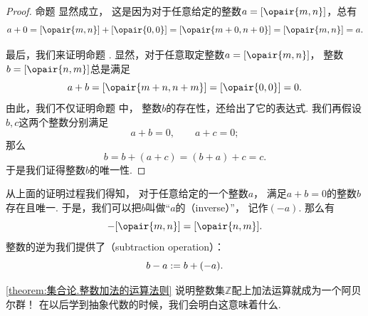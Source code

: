 \begin{theorem}
\begin{proof}
命题  显然成立，
这是因为对于任意给定的整数\(a = \EquivalenceClassB{\opair{m,n}}[\sim]\)，总有\begin{equation*}
	a+0
	= \EquivalenceClassB{\opair{m,n}}[\sim]+\EquivalenceClassB{\opair{0,0}}[\sim]
	= \EquivalenceClassB{\opair{m+0,n+0}}[\sim]
	= \EquivalenceClassB{\opair{m,n}}[\sim]
	= a.
\end{equation*}

最后，我们来证明命题 .
显然，对于任意取定整数\(a = \EquivalenceClassB{\opair{m,n}}[\sim]\)，
整数\(b = \EquivalenceClassB{\opair{n,m}}[\sim]\)总是满足\begin{equation*}
	a+b
	= \EquivalenceClassB{\opair{m+n,n+m}}[\sim]
	= \EquivalenceClassB{\opair{0,0}}[\sim]
	= 0.
\end{equation*}
由此，我们不仅证明命题  中，
整数\(b\)的存在性，还给出了它的表达式.
我们再假设\(b,c\)这两个整数分别满足\begin{equation*}
	a+b=0, \qquad
	a+c=0;
\end{equation*}
那么\begin{equation*}
	b=b+(a+c)=(b+a)+c=c.
\end{equation*}
于是我们证得整数\(b\)的唯一性.
\end{proof}
\end{theorem}

从上面的证明过程我们得知，
对于任意给定的一个整数\(a\)，
满足\(a+b=0\)的整数\(b\)存在且唯一.
于是，我们可以把\(b\)叫做“\(a\)的（inverse）”，
记作\((-a)\).
那么有\begin{equation}
	-\EquivalenceClassB{\opair{m,n}}[\sim]=\EquivalenceClassB{\opair{n,m}}[\sim].
\end{equation}
整数的逆为我们提供了（subtraction operation）：
\begin{equation}
	b-a := b+(-a).
\end{equation}

\cref{theorem:集合论.整数加法的运算法则}
说明整数集\(\mathbb{Z}\)配上加法运算就成为一个阿贝尔群！
在以后学到抽象代数的时候，我们会明白这意味着什么.

